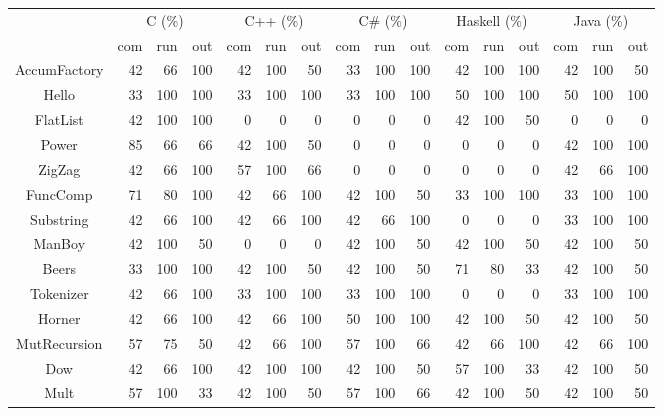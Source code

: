 \documentclass[10pt]{sigplanconf}
\begin{document}
\begin{table*}
\begin{center}
\begin{tabular}{ c r r r r r r r r r r r r r r r }
\hline
 & \multicolumn{3}{c}{C (\%)} & \multicolumn{3}{c}{C++ (\%)} & \multicolumn{3}{c}{C\# (\%)} & \multicolumn{3}{c}{Haskell (\%)} & \multicolumn{3}{c}{Java (\%)}\\
 & com & run & out & com & run & out & com & run & out & com & run & out & com & run & out \\
\hline
AccumFactory &  42 & 66 & 100 & 42 & 100 & 50 & 33 & 100 & 100 & 42 & 100 & 100 & 42 & 100 & 50 \\
Hello &  33 & 100 & 100 & 33 & 100 & 100 & 33 & 100 & 100 & 50 & 100 & 100 & 50 & 100 & 100 \\
FlatList &  42 & 100 & 100 & 0 & 0 & 0 & 0 & 0 & 0 & 42 & 100 & 50 & 0 & 0 & 0 \\
Power &  85 & 66 & 66 & 42 & 100 & 50 & 0 & 0 & 0 & 0 & 0 & 0 & 42 & 100 & 100 \\
ZigZag &  42 & 66 & 100 & 57 & 100 & 66 & 0 & 0 & 0 & 0 & 0 & 0 & 42 & 66 & 100 \\
FuncComp &  71 & 80 & 100 & 42 & 66 & 100 & 42 & 100 & 50 & 33 & 100 & 100 & 33 & 100 & 100 \\
Substring &  42 & 66 & 100 & 42 & 66 & 100 & 42 & 66 & 100 & 0 & 0 & 0 & 33 & 100 & 100 \\
ManBoy &  42 & 100 & 50 & 0 & 0 & 0 & 42 & 100 & 50 & 42 & 100 & 50 & 42 & 100 & 50 \\
Beers &  33 & 100 & 100 & 42 & 100 & 50 & 42 & 100 & 50 & 71 & 80 & 33 & 42 & 100 & 50 \\
Tokenizer &  42 & 66 & 100 & 33 & 100 & 100 & 33 & 100 & 100 & 0 & 0 & 0 & 33 & 100 & 100 \\
Horner &  42 & 66 & 100 & 42 & 66 & 100 & 50 & 100 & 100 & 42 & 100 & 50 & 42 & 100 & 50 \\
MutRecursion &  57 & 75 & 50 & 42 & 66 & 100 & 57 & 100 & 66 & 42 & 66 & 100 & 42 & 66 & 100 \\
Dow &  42 & 66 & 100 & 42 & 100 & 100 & 42 & 100 & 50 & 57 & 100 & 33 & 42 & 100 & 50 \\
Mult &  57 & 100 & 33 & 42 & 100 & 50 & 57 & 100 & 66 & 42 & 100 & 50 & 42 & 100 & 50 \\
\hline
\end{tabular}
\end{center}
\end{table*}
\end{document}
